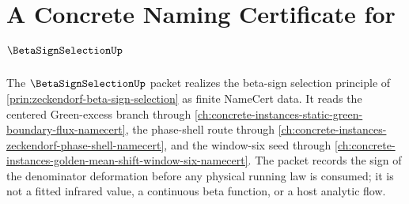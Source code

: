 \chapter{A Concrete Naming Certificate for $\BetaSignSelectionUp$}
\label{ch:concrete-instances-beta-sign-selection-namecert}

The $\BetaSignSelectionUp$ packet realizes the beta-sign selection principle of \autoref{prin:zeckendorf-beta-sign-selection} as finite NameCert data. It reads the centered Green-excess branch through \autoref{ch:concrete-instances-static-green-boundary-flux-namecert}, the phase-shell route through \autoref{ch:concrete-instances-zeckendorf-phase-shell-namecert}, and the window-six seed through \autoref{ch:concrete-instances-golden-mean-shift-window-six-namecert}. The packet records the sign of the denominator deformation before any physical running law is consumed; it is not a fitted infrared value, a continuous beta function, or a host analytic flow.



